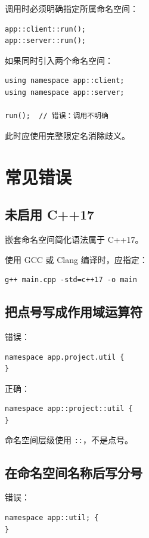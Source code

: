 \documentclass[UTF8,12pt,a4paper]{ctexart}
\begin{document}
调用时必须明确指定所属命名空间：

\begin{lstlisting}
app::client::run();
app::server::run();
\end{lstlisting}

如果同时引入两个命名空间：

\begin{lstlisting}
using namespace app::client;
using namespace app::server;

run();  // 错误：调用不明确
\end{lstlisting}

此时应使用完整限定名消除歧义。

\section{常见错误}

\subsection{未启用 C++17}

嵌套命名空间简化语法属于 C++17。

使用 GCC 或 Clang 编译时，应指定：

\begin{verbatim}
g++ main.cpp -std=c++17 -o main
\end{verbatim}

\subsection{把点号写成作用域运算符}

错误：

\begin{lstlisting}
namespace app.project.util {
}
\end{lstlisting}

正确：

\begin{lstlisting}
namespace app::project::util {
}
\end{lstlisting}

命名空间层级使用 \texttt{::}，不是点号。

\subsection{在命名空间名称后写分号}

错误：

\begin{lstlisting}
namespace app::util; {
}
\end{lstlisting}
\end{document}
